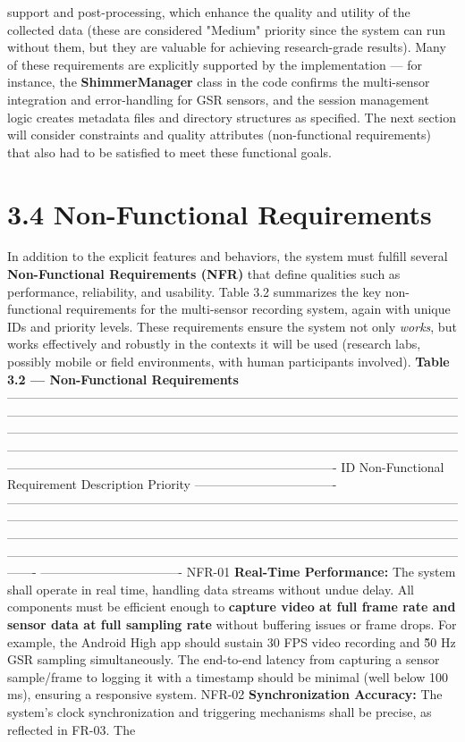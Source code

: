 support and post-processing, which enhance the quality and utility of the collected data (these are considered "Medium" priority since the system can run without them, but they are valuable for achieving research-grade results). Many of these requirements are explicitly supported by the implementation --- for instance, the \textbf{ShimmerManager} class in the code confirms the multi-sensor integration and error-handling for GSR sensors, and the session management logic creates metadata files and directory structures as specified. The next section will consider constraints and quality attributes (non-functional requirements) that also had to be satisfied to meet these functional goals. \section{3.4 Non-Functional Requirements} In addition to the explicit features and behaviors, the system must fulfill several \textbf{Non-Functional Requirements (NFR)} that define qualities such as performance, reliability, and usability. Table 3.2 summarizes the key non-functional requirements for the multi-sensor recording system, again with unique IDs and priority levels. These requirements ensure the system not only \textit{works}, but works effectively and robustly in the contexts it will be used (research labs, possibly mobile or field environments, with human participants involved). \textbf{Table 3.2 --- Non-Functional Requirements} ------------------------------------------------------------------------------------------------------------------------------------------------------------------------------------------------------------------------------------------------------------------------------------------------------------------------------------------------------------------------------------------------------------------------------------------------------------------------------------------------------------------------------- ID Non-Functional Requirement Description Priority ---------------------------------- ------------------------------------------------------------------------------------------------------------------------------------------------------------------------------------------------------------------------------------------------------------------------------------------------------------------------------------------------------------------------------------------------------------------------------------------------------- ---------------------------------- NFR-01 \textbf{Real-Time Performance:} The system shall operate in real time, handling data streams without undue delay. All components must be efficient enough to \textbf{capture video at full frame rate and sensor data at full sampling rate} without buffering issues or frame drops. For example, the Android High app should sustain 30 FPS video recording and \~50 Hz GSR sampling simultaneously. The end-to-end latency from capturing a sensor sample/frame to logging it with a timestamp should be minimal (well below 100 ms), ensuring a responsive system. NFR-02 \textbf{Synchronization Accuracy:} The system's clock synchronization and triggering mechanisms shall be precise, as reflected in FR-03. The 